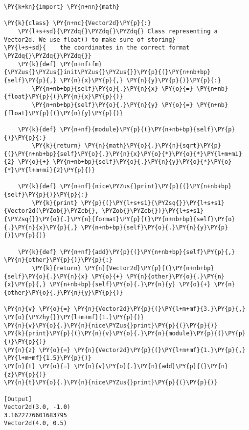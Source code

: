 \begin{Verbatim}[label=\makebox{\url{https://bitbucket.org/lbaldini/programming/src/tip/snippets/vector2d\_naive.py}},commandchars=\\\{\}]
\PY{k+kn}{import} \PY{n+nn}{math}

\PY{k}{class} \PY{n+nc}{Vector2d}\PY{p}{:}
    \PY{l+s+sd}{\PYZdq{}\PYZdq{}\PYZdq{} Class representing a Vector2d. We use float() to make sure of storing}
\PY{l+s+sd}{    the coordinates in the correct format \PYZdq{}\PYZdq{}\PYZdq{}}   
    \PY{k}{def} \PY{n+nf+fm}{\PYZus{}\PYZus{}init\PYZus{}\PYZus{}}\PY{p}{(}\PY{n+nb+bp}{self}\PY{p}{,} \PY{n}{x}\PY{p}{,} \PY{n}{y}\PY{p}{)}\PY{p}{:}
        \PY{n+nb+bp}{self}\PY{o}{.}\PY{n}{x} \PY{o}{=} \PY{n+nb}{float}\PY{p}{(}\PY{n}{x}\PY{p}{)}
        \PY{n+nb+bp}{self}\PY{o}{.}\PY{n}{y} \PY{o}{=} \PY{n+nb}{float}\PY{p}{(}\PY{n}{y}\PY{p}{)}
   
    \PY{k}{def} \PY{n+nf}{module}\PY{p}{(}\PY{n+nb+bp}{self}\PY{p}{)}\PY{p}{:}
        \PY{k}{return} \PY{n}{math}\PY{o}{.}\PY{n}{sqrt}\PY{p}{(}\PY{n+nb+bp}{self}\PY{o}{.}\PY{n}{x}\PY{o}{*}\PY{o}{*}\PY{l+m+mi}{2} \PY{o}{+} \PY{n+nb+bp}{self}\PY{o}{.}\PY{n}{y}\PY{o}{*}\PY{o}{*}\PY{l+m+mi}{2}\PY{p}{)}
       
    \PY{k}{def} \PY{n+nf}{nice\PYZus{}print}\PY{p}{(}\PY{n+nb+bp}{self}\PY{p}{)}\PY{p}{:}
        \PY{k}{print} \PY{p}{(}\PY{l+s+s1}{\PYZsq{}}\PY{l+s+s1}{Vector2d(\PYZob{}\PYZcb{}, \PYZob{}\PYZcb{})}\PY{l+s+s1}{\PYZsq{}}\PY{o}{.}\PY{n}{format}\PY{p}{(}\PY{n+nb+bp}{self}\PY{o}{.}\PY{n}{x}\PY{p}{,} \PY{n+nb+bp}{self}\PY{o}{.}\PY{n}{y}\PY{p}{)}\PY{p}{)}
   
    \PY{k}{def} \PY{n+nf}{add}\PY{p}{(}\PY{n+nb+bp}{self}\PY{p}{,} \PY{n}{other}\PY{p}{)}\PY{p}{:}
        \PY{k}{return} \PY{n}{Vector2d}\PY{p}{(}\PY{n+nb+bp}{self}\PY{o}{.}\PY{n}{x} \PY{o}{+} \PY{n}{other}\PY{o}{.}\PY{n}{x}\PY{p}{,} \PY{n+nb+bp}{self}\PY{o}{.}\PY{n}{y} \PY{o}{+} \PY{n}{other}\PY{o}{.}\PY{n}{y}\PY{p}{)}
       
\PY{n}{v} \PY{o}{=} \PY{n}{Vector2d}\PY{p}{(}\PY{l+m+mf}{3.}\PY{p}{,} \PY{o}{\PYZhy{}}\PY{l+m+mf}{1.}\PY{p}{)}
\PY{n}{v}\PY{o}{.}\PY{n}{nice\PYZus{}print}\PY{p}{(}\PY{p}{)}
\PY{k}{print}\PY{p}{(}\PY{n}{v}\PY{o}{.}\PY{n}{module}\PY{p}{(}\PY{p}{)}\PY{p}{)}
\PY{n}{z} \PY{o}{=} \PY{n}{Vector2d}\PY{p}{(}\PY{l+m+mf}{1.}\PY{p}{,} \PY{l+m+mf}{1.5}\PY{p}{)}
\PY{n}{t} \PY{o}{=} \PY{n}{v}\PY{o}{.}\PY{n}{add}\PY{p}{(}\PY{n}{z}\PY{p}{)}
\PY{n}{t}\PY{o}{.}\PY{n}{nice\PYZus{}print}\PY{p}{(}\PY{p}{)}

[Output]
Vector2d(3.0, -1.0)
3.1622776601683795
Vector2d(4.0, 0.5)
\end{Verbatim}